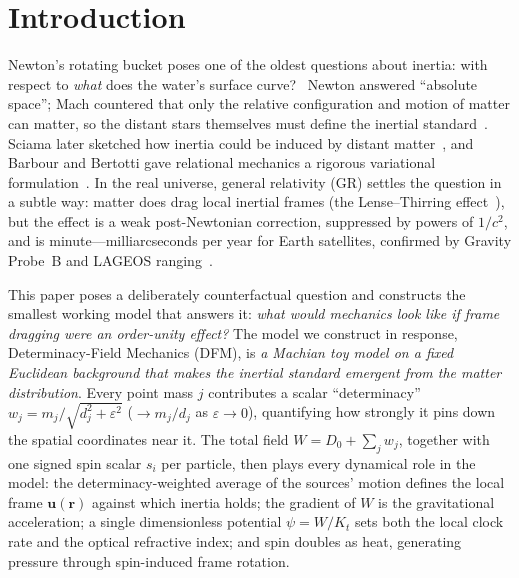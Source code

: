 \documentclass[aps,reprint,amsmath,amssymb,nofootinbib,superscriptaddress,floatfix]{revtex4-2}
\newcommand{\vect}[1]{\bm{#1}}
\newcommand{\Kt}{K_t}
\newcommand{\Dz}{D_0}
\begin{document}
\maketitle

\section{Introduction}
\label{sec:intro}

Newton's rotating bucket poses one of the oldest questions about
inertia: with
respect to \emph{what} does the water's surface curve?~\cite{Newton1687}
Newton answered ``absolute space''; Mach countered that only the
relative configuration and motion of matter can matter, so the distant
stars themselves must define the inertial standard~\cite{Mach1883}.
Sciama later sketched how inertia could be induced by distant
matter~\cite{Sciama1953}, and Barbour and Bertotti gave relational
mechanics a rigorous variational formulation~\cite{BarbourBertotti1982}.
In the real universe, general relativity (GR) settles the question in a
subtle way: matter does drag local inertial frames (the Lense--Thirring
effect~\cite{LenseThirring1918}), but the effect is a weak
post-Newtonian correction, suppressed by powers of $1/c^2$, and is
minute---milliarcseconds per year for Earth
satellites, confirmed by Gravity Probe~B and LAGEOS
ranging~\cite{Everitt2011,CiufoliniPavlis2004}.

This paper poses a deliberately counterfactual question and constructs
the smallest working model that answers it:
\emph{what would mechanics look like if frame dragging were an
order-unity effect?}
The model we construct in response, Determinacy-Field Mechanics (DFM),
is
\emph{a Machian toy model on a fixed Euclidean background that makes the
inertial standard emergent from the matter distribution}.
Every point mass $j$ contributes a scalar ``determinacy''
$w_j = m_j/\sqrt{d_j^2+\varepsilon^2}$ ($\to m_j/d_j$ as
$\varepsilon \to 0$), quantifying how strongly it pins down the spatial
coordinates near it.
The total field $W = \Dz + \sum_j w_j$, together with one signed spin
scalar $s_i$ per particle, then plays every dynamical role in the model:
the determinacy-weighted average of the sources' motion defines the
local frame $\vect{u}(\vect{r})$ against which inertia holds; the
gradient of $W$ is the gravitational acceleration; a single
dimensionless potential $\psi = W/\Kt$ sets both the local clock rate
and the optical refractive index; and spin doubles as heat, generating
pressure through spin-induced frame rotation.
\end{document}

